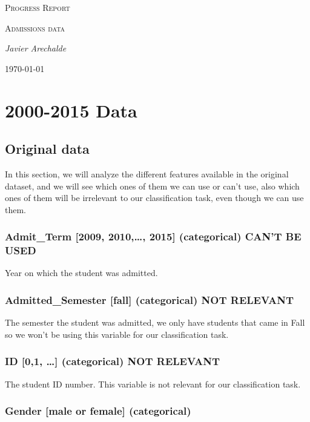 \documentclass{article}
\begin{document}
\begin{titlepage}
	\centering
	{\scshape\LARGE Progress Report\par}
	\vspace{1cm}
	{\scshape\Large Admissions data\par}
	\vspace{1.5cm}
	{\Large\itshape Javier Arechalde\par}
	\vfill
	{\large \today\par}
\end{titlepage}

\section{2000-2015 Data}

\subsection*{Original data}
 
In this section, we will analyze the different features available in the original dataset, and we will see which ones of them we can use or can't use, also which ones of them will be irrelevant to our classification task, even though we can use them.

\subsubsection*{Admit\_Term [2009, 2010,\dots, 2015] (categorical) CAN'T BE USED}

Year on which the student was admitted.

\subsubsection*{Admitted\_Semester [fall] (categorical) NOT RELEVANT}

The semester the student was admitted, we only have students that came in Fall so we won't be using this variable for our classification task.

\subsubsection*{ID [0,1, \dots] (categorical) NOT RELEVANT}

The student ID number. This variable is not relevant for our classification task.

\subsubsection*{Gender [male or female] (categorical)}
\end{document}
